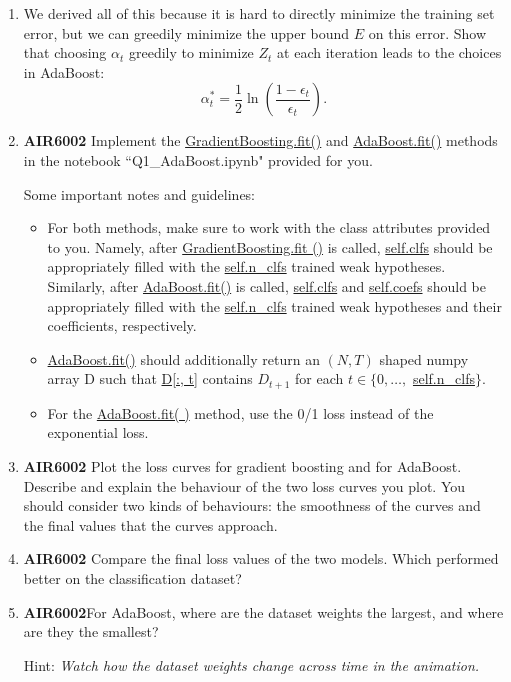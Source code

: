 \documentclass[
	12pt, %
]{fphw}
\begin{document}
\begin{problem}
	\begin{enumerate}
	\item We derived all of this because it is hard to directly minimize the training set error, but we can greedily minimize the upper bound $E$ on this error. Show that choosing $\alpha_t$ greedily to minimize $Z_t$ at each iteration leads to the choices in AdaBoost:  
		$$
		\alpha_t^*=\frac{1}{2} \ln \left(\frac{1-\epsilon_t}{\epsilon_t}\right).
		$$
		\item  \textbf{AIR6002} Implement the \url{GradientBoosting.fit()} and \url{AdaBoost.fit()} methods in the notebook ``Q1\_AdaBoost.ipynb" provided for you. 

Some important notes and guidelines:


		\begin{itemize}
		\item For both methods, make sure to work with the class attributes provided to you. Namely, after \url{GradientBoosting.fit ()} is called, \url{self.clfs} should be appropriately filled with the \url{self.n_clfs} trained weak hypotheses. Similarly, after \url{AdaBoost.fit()} is called, \url{self.clfs} and \url{self.coefs} should be appropriately filled with the \url{self.n_clfs} trained weak hypotheses and their coefficients, respectively.
		\item \url{AdaBoost.fit()} should additionally return an $(N, T)$ shaped numpy array D such that \url{D[:, t]} contains $D_{t+1}$ for each $t \in\{0, \ldots,$ \url{self.n_clfs}$\}$.

		\item For the \url{AdaBoost.fit( )} method, use the 0/1 loss instead of the exponential loss.
		\end{itemize} 



\item \textbf{AIR6002}
Plot the loss curves for gradient boosting and for AdaBoost. 
Describe and explain the behaviour of the two loss curves you plot. You should consider two kinds of behaviours: the smoothness of the curves and the final values that the curves approach. 



\item \textbf{AIR6002} Compare the final loss values of the two models. Which performed better on the classification dataset?



\item \textbf{AIR6002}For AdaBoost, where are the dataset weights the largest, and where are they the smallest? 

Hint: \textit{Watch how the dataset weights change across time in the animation.}

\end{enumerate}
\end{problem}
\end{document}
